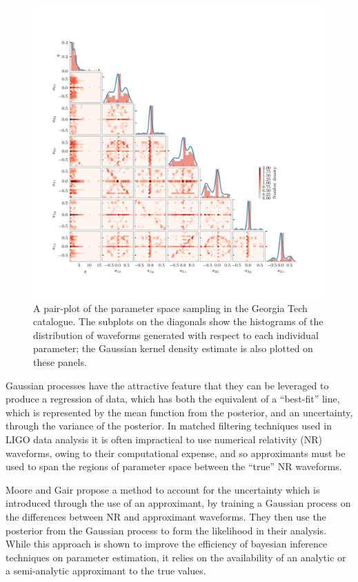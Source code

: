 \documentclass[openleft]{kentigern}
\theoremstyle{definition}
\begin{document}
\begin{figure}
  \centering
  \includegraphics{figures/georgiatech-density-plot.pdf}
  \caption{A pair-plot of the parameter space sampling in the Georgia
    Tech catalogue. The subplots on the diagonals show the histograms
    of the distribution of waveforms generated with respect to each
    individual parameter; the Gaussian kernel density estimate is also
    plotted on these panels.}
  \label{fig:georgiatech-pairplot}
\end{figure}
Gaussian processes have the attractive feature that they can be
leveraged to produce a regression of data, which has both the
equivalent of a ``best-fit'' line, which is represented by the mean
function from the posterior, and an uncertainty, through the variance
of the posterior. In matched filtering techniques used in LIGO data
analysis it is often impractical to use numerical relativity (NR)
waveforms, owing to their computational expense, and so approximants
must be used to span the regions of parameter space between the
``true'' NR waveforms.

Moore and Gair\cite{2014PhRvL.113y1101M,2016PhRvD..93f4001M} propose a
method to account for the uncertainty which is introduced through the
use of an approximant, by training a Gaussian process on the
differences between NR and approximant waveforms. They then use the
posterior from the Gaussian process to form the likelihood in their
analysis. While this approach is shown to improve the efficiency of
bayesian inference techniques on parameter estimation, it relies on
the availability of an analytic or a semi-analytic approximant to the
true values.
\end{document}
